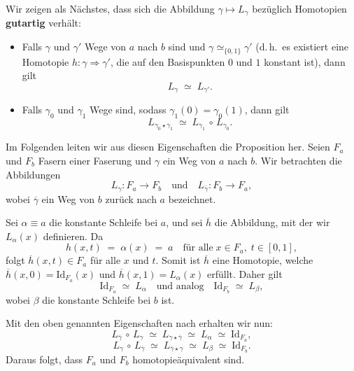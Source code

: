 \documentclass[12pt]{article}
\numberwithin{conj}{section}
\begin{document}
    Wir zeigen als Nächstes, dass sich die Abbildung $\gamma \mapsto L_{\gamma}$ bezüglich
    Homotopien \cite[Prop.~4.61]{hatcher2001} \textbf{gutartig} verhält:
    \begin{itemize}[noitemsep]
        \item Falls $\gamma$ und $\gamma'$ Wege von $a$ nach $b$ sind und $\gamma \simeq
            _{\{0,1\}}\gamma'$ (d.\,h.\ es existiert eine Homotopie
            $h : \gamma \Rightarrow \gamma'$, die auf den Basispunkten $0$ und $1$ konstant
            ist), dann gilt
            \[
                L_{\gamma} \;\simeq\; L_{\gamma'}.
            \]

        \item Falls $\gamma_{0}$ und $\gamma_{1}$ Wege sind, sodass
            $\gamma_{1}(0) = \gamma_{0}(1)$, dann gilt
            \[
                L_{\gamma_0 \star \gamma_1}\;\simeq\; L_{\gamma_1}\,\circ\, L_{\gamma_0}.
            \]
    \end{itemize}
    Im Folgenden leiten wir aus diesen Eigenschaften die Proposition her. Seien
    $F_{a}$ und $F_{b}$ Fasern einer Faserung und $\gamma$ ein Weg von $a$ nach
    $b$. Wir betrachten die Abbildungen
    \[
        L_{\gamma} : F_{a} \longrightarrow F_{b} \quad\text{und}\quad L_{\overline{\gamma}}
        : F_{b} \longrightarrow F_{a},
    \]
    wobei $\overline{\gamma}$ ein Weg von $b$ zurück nach $a$ bezeichnet.

    \smallskip

    Sei $\alpha \equiv a$ die konstante Schleife bei $a$, und sei $\overline{h}$ die
    Abbildung, mit der wir $L_{\alpha}(x)$ definieren. Da
    \[
        h(x,t) \;=\; \alpha(x) \;=\; a \quad\text{für alle}\; x\in F_{a},\; t\in [0,1
        ],
    \]
    folgt $\overline{h}(x,t) \in F_{a}$ für alle $x$ und $t$. Somit ist
    $\overline{h}$ eine Homotopie, welche $\overline{h}(x,0) = \mathrm{Id}_{F_a}(x)$
    und $\overline{h}(x,1) = L_{\alpha}(x)$ erfüllt. Daher gilt
    \[
        \mathrm{Id}_{F_a}\;\simeq\; L_{\alpha} \quad\text{und analog}\quad \mathrm{Id}
        _{F_b}\;\simeq\; L_{\beta},
    \]
    wobei $\beta$ die konstante Schleife bei $b$ ist.

    \smallskip

    Mit den oben genannten Eigenschaften nach \cite[Prop.~4.61]{hatcher2001} erhalten
    wir nun:
    \[
        L_{\overline{\gamma}}\,\circ\, L_{\gamma} \;\simeq\; L_{\gamma \star
        \overline{\gamma}}\;\simeq\; L_{\alpha} \;\simeq\; \mathrm{Id}_{F_a},
    \]
    \[
        L_{\gamma}\,\circ\, L_{\overline{\gamma}}\;\simeq\; L_{\overline{\gamma} \star
        \gamma}\;\simeq\; L_{\beta} \;\simeq\; \mathrm{Id}_{F_b}.
    \]
    Daraus folgt, dass $F_{a}$ und $F_{b}$ homotopieäquivalent sind.
\end{document}
